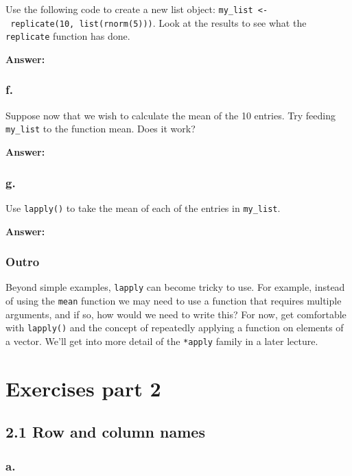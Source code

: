 \documentclass[]{article}
\begin{document}
Use the following code to create a new list object:
\texttt{my\_list\ \textless{}-\ replicate(10,\ list(rnorm(5)))}. Look at
the results to see what the \texttt{replicate} function has done.

\textbf{Answer:}

\hypertarget{f.-1}{%
\subsubsection{f.}\label{f.-1}}

Suppose now that we wish to calculate the mean of the 10 entries. Try
feeding \texttt{my\_list} to the function mean. Does it work?

\textbf{Answer:}

\hypertarget{g.}{%
\subsubsection{g.}\label{g.}}

Use \texttt{lapply()} to take the mean of each of the entries in
\texttt{my\_list}.

\textbf{Answer:}

\hypertarget{outro}{%
\subsubsection{Outro}\label{outro}}

Beyond simple examples, \texttt{lapply} can become tricky to use. For
example, instead of using the \texttt{mean} function we may need to use
a function that requires multiple arguments, and if so, how would we
need to write this? For now, get comfortable with \texttt{lapply()} and
the concept of repeatedly applying a function on elements of a vector.
We'll get into more detail of the \texttt{*apply} family in a later
lecture.

\newpage

\hypertarget{exercises-part-2}{%
\section{Exercises part 2}\label{exercises-part-2}}

\hypertarget{row-and-column-names}{%
\subsection{2.1 Row and column names}\label{row-and-column-names}}

\hypertarget{a.-4}{%
\subsubsection{a.}\label{a.-4}}
\end{document}
